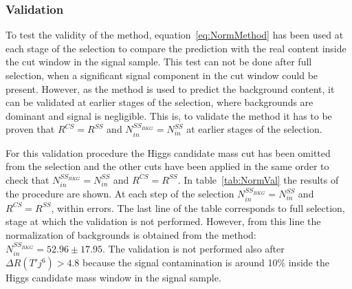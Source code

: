\subsubsection{Validation}
\label{sec:normval}

To test the validity of the method, equation~\ref{eq:NormMethod} has been used at each stage of the selection to compare the prediction with the real content inside the cut window in the signal sample. This test can not be done after full selection, when a significant signal component in the cut window could be present. However, as the method is used to predict the background content, it can be validated at earlier stages of the selection, where backgrounds are dominant and signal is negligible. This is, to validate the method it has to be proven that $R^{CS}=R^{SS}$ and $N^{SS_{BKG}}_{in}=N^{SS}_{in}$ at earlier stages of the selection.

For this validation procedure the Higgs candidate mass cut has been omitted from the selection and the other cuts have been applied in the same order to check that $N^{SS_{BKG}}_{in}=N^{SS}_{in}$ and $R^{CS}=R^{SS}$. In table~\ref{tab:NormVal} the results of the procedure are shown. At each step of the selection $N^{SS_{BKG}}_{in}=N^{SS}_{in}$ and $R^{CS}=R^{SS}$, within errors. The last line of the table corresponds to full selection, stage at which the validation is not performed. However, from this line the normalization of backgrounds is obtained from the method: $N^{SS_{BKG}}_{in}=52.96\pm17.95$. The validation is not performed also after $ \Delta R (T' j^{6})>4.8$ because the signal contamination is around 10\% inside the Higgs candidate mass window in the signal sample.

